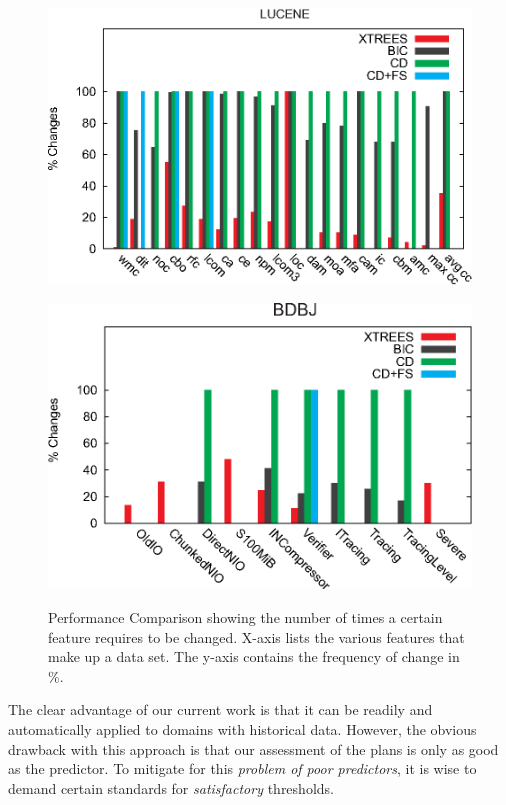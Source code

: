\documentclass{sig-alternate}
\begin{document}
\begin{figure}[t]
\begin{minipage}{0.5\textwidth}
\includegraphics[width=0.9\linewidth]{_figs/Deltas-Lucene.eps}
\label{fig:delta_ivy}
\end{minipage}
\begin{minipage}{0.5\textwidth}
\includegraphics[width=0.9\linewidth]{_figs/Deltas-BDBJ.eps}
\label{fig:delta_apache}
\end{minipage}
\caption{Performance Comparison showing the number of times a certain feature requires to be changed. X-axis lists the various features that make up a data set. The y-axis contains the frequency of change in \%.}
\end{figure}

The clear advantage of our current work is that it can be readily and automatically applied to domains with historical data. However, the obvious drawback with this approach is that our assessment of the plans is only as good as the predictor. To mitigate for this {\em problem of poor predictors}, it is wise to demand certain standards for {\em satisfactory} thresholds. 
\end{document}
